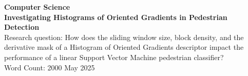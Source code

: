 \documentclass[a4paper, 12pt]{article}
\begin{document}

\begin{titlepage}
    \begin{center}
        \vspace*{1cm}
        \large{\textbf{Computer Science}}\\
        \vspace{3cm}
        \Large{\textbf{Investigating Histograms of Oriented Gradients in Pedestrian Detection}}\\
        \vspace{1.5cm}
        \large{Research question: How does the sliding window size, block density, and the derivative mask of a Histogram of Oriented Gradients descriptor impact the performance of a linear Support Vector Machine pedestrian classifier?}\\
        \vspace{3cm}
        \large{Word Count: 2000}
        \vfill
        \large{May 2025}
    \end{center}
\end{titlepage}




\begin{center}
\begin{spacing}{0.1}
\tableofcontents
\end{spacing}

\vspace{1in}
\end{center}
\newpage
{}












\newpage
\printbibliography[
heading=bibintoc,
]
\newpage

\end{document}
